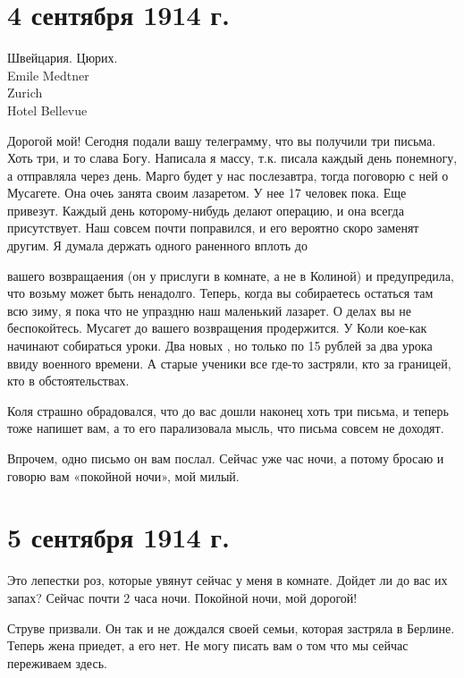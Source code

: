 \section{4 сентября 1914 г.}


Швейцария. Цюрих. \\
Emile Medtner \\
Zurich \\
Hotel Bellevue


Дорогой мой! Сегодня подали вашу телеграмму, что вы получили три письма. Хоть
три, и то слава Богу. Написала я массу, т.к. писала каждый день понемногу, а
отправляла через день. Марго будет у нас послезавтра, тогда поговорю с ней о
Мусагете. Она очеь занята своим лазаретом. У нее 17 человек пока. Еще привезут.
Каждый день которому-нибудь делают операцию, и она всегда присутствует. Наш
 совсем почти поправился, и его вероятно скоро заменят другим. Я
думала держать одного раненного вплоть до


\noindent
вашего возвращаения (он у прислуги в комнате, а не в Колиной) и
предупредила, что возьму может быть ненадолго. Теперь, когда вы собираетесь
остаться там всю зиму, я пока что не упраздню наш маленький лазарет. О делах вы
не беспокойтесь. Мусагет до вашего возвращения продержится. У Коли кое-как
начинают собираться уроки. Два новых , но только по 15 рублей за
два урока ввиду военного времени. А старые ученики все где-то застряли, кто за
границей, кто в обстоятельствах.

Коля страшно обрадовался, что до вас дошли наконец хоть три письма, и теперь
тоже напишет вам, а то его парализовала мысль, что письма совсем не доходят.


Впрочем, одно письмо он вам послал. Сейчас уже час ночи, а потому бросаю и
говорю вам «покойной ночи», мой милый.

\section{5 сентября 1914 г.}


Это лепестки роз, которые увянут сейчас у меня в комнате. Дойдет ли до вас их
запах? Сейчас почти 2 часа ночи. Покойной ночи, мой дорогой!

Струве призвали. Он так и не дождался своей семьи, которая застряла в Берлине.
Теперь жена приедет, а его нет. Не могу писать вам о том что мы сейчас
переживаем здесь.
